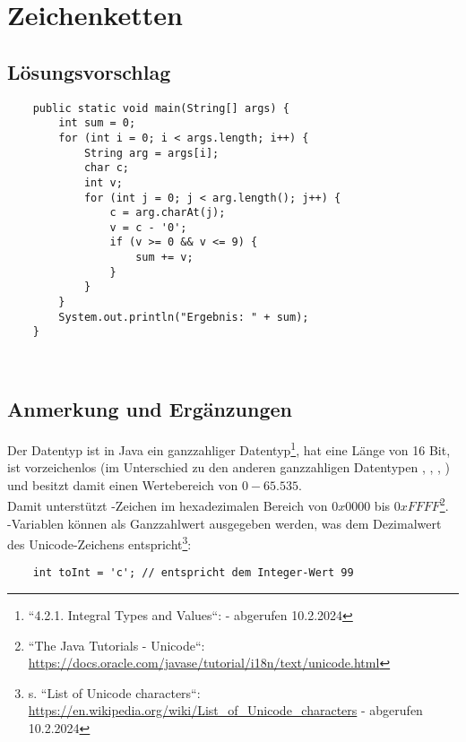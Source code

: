 \chapter{Zeichenketten}

\section{Lösungsvorschlag}

\begin{verbatim}
    public static void main(String[] args) {
        int sum = 0;
        for (int i = 0; i < args.length; i++) {
            String arg = args[i];
            char c;
            int v;
            for (int j = 0; j < arg.length(); j++) {
                c = arg.charAt(j);
                v = c - '0';
                if (v >= 0 && v <= 9) {
                    sum += v;
                }
            }
        }
        System.out.println("Ergebnis: " + sum);
    }
\end{verbatim}\\

\section{Anmerkung und Ergänzungen}

Der Datentyp  ist in Java ein ganzzahliger Datentyp\footnote{
    ``4.2.1. Integral Types and Values``:  - abgerufen 10.2.2024
}, hat eine Länge von 16 Bit, ist vorzeichenlos (im Unterschied zu den anderen ganzzahligen Datentypen , , , ) und besitzt damit einen Wertebereich von $0 - 65.535$.\\
Damit unterstützt  -Zeichen im hexadezimalen Bereich von $0x0000$ bis $0xFFFF$\footnote{
    ``The Java Tutorials - Unicode``: \url{https://docs.oracle.com/javase/tutorial/i18n/text/unicode.html}
}.\\

\noindent
{}-Variablen können als Ganzzahlwert ausgegeben werden, was dem Dezimalwert des Unicode-Zeichens entspricht\footnote{s. ``List of Unicode characters``: \url{https://en.wikipedia.org/wiki/List_of_Unicode_characters} - abgerufen 10.2.2024}:

\begin{verbatim}
    int toInt = 'c'; // entspricht dem Integer-Wert 99
\end{verbatim}

